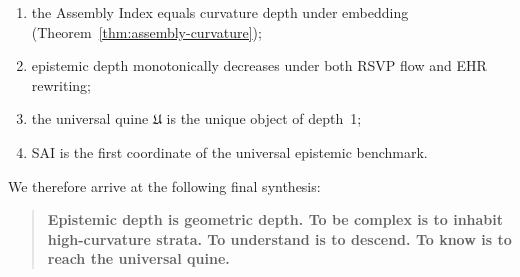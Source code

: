 \begin{enumerate}
  \item the Assembly Index equals curvature depth under embedding
        (Theorem~\ref{thm:assembly-curvature});
  \item epistemic depth monotonically decreases under both RSVP flow and
        EHR rewriting;
  \item the universal quine $\mathfrak{U}$ is the unique object of depth~1;
  \item SAI is the first coordinate of the universal epistemic benchmark.
\end{enumerate}

We therefore arrive at the following final synthesis:

\begin{quote}
\textbf{Epistemic depth is geometric depth.  
To be complex is to inhabit high-curvature strata.  
To understand is to descend.  
To know is to reach the universal quine.}
\end{quote}
